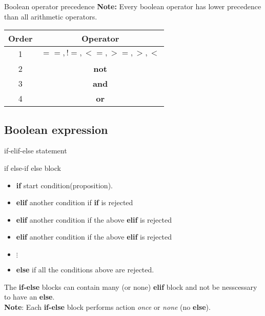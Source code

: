 \documentclass[aspectratio=43]{beamer}
\begin{document}
\begin{frame}{Boolean operator precedence}
    \textbf{Note:} Every boolean operator has lower precedence than all arithmetic operators.
    \begin{center}
        \begin{tabular}{|c|c|}
            \hline
            Order & Operator          \\
            \hline
            1     & $==,!=,<=,>=,>,<$ \\
            \hline
            2     & \textbf{not}      \\
            \hline
            3     & \textbf{and}      \\
            \hline
            4     & \textbf{or}       \\
            \hline
        \end{tabular}
    \end{center}
\end{frame}

\begin{frame}
    \begin{example}
        
    \end{example}
\end{frame}

\subsection[Boolean expression]{Boolean expression}
\begin{frame}{if-elif-else statement}
    \begin{block}{if else-if else block}
        \begin{itemize}
            \item \textbf{if} start condition(proposition).
            \item \textbf{elif} another condition if \textbf{if} is rejected
            \item \textbf{elif} another condition if the above \textbf{elif} is rejected
            \item \textbf{elif} another condition if the above \textbf{elif} is rejected
            \item $\vdots$
            \item \textbf{else} if all the conditions above are rejected.
        \end{itemize}
        The \textbf{if-else} blocks can contain many (or none) \textbf{elif} block and not be nesscessary to have an \textbf{else}. \\
        \textbf{Note}: Each \textbf{if-else} block performs action \textit{once} or \textit{none} (no \textbf{else}).
    \end{block}
\end{frame}
\end{document}
